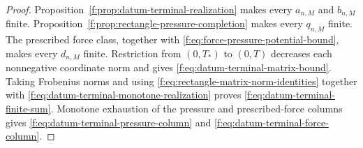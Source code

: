 \begin{proof}
Proposition~\ref{f:prop:datum-terminal-realization} makes every
\(a_{n,M}\) and \(b_{n,M}\) finite.
Proposition~\ref{f:prop:rectangle-pressure-completion} makes every
\(q_{n,M}\) finite.  The prescribed force class, together with
\eqref{f:eq:force-pressure-potential-bound}, makes every \(d_{n,M}\) finite.
Restriction from \((0,T_*)\) to \((0,T)\) decreases each nonnegative
coordinate norm and gives
\eqref{f:eq:datum-terminal-matrix-bound}.  Taking Frobenius norms and using
\eqref{f:eq:rectangle-matrix-norm-identities} together with
\eqref{f:eq:datum-terminal-monotone-realization} proves
\eqref{f:eq:datum-terminal-finite-sum}.  Monotone exhaustion of the pressure
and prescribed-force columns gives
\eqref{f:eq:datum-terminal-pressure-column} and
\eqref{f:eq:datum-terminal-force-column}.
\end{proof}

